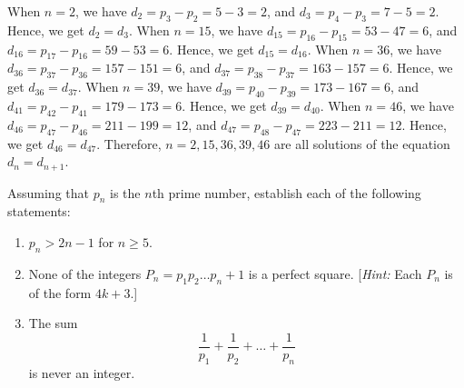 \begin{solution}
    When $n = 2$, we have $d_2 = p_3 - p_2 = 5 - 3 = 2$, and $d_3 = p_4 - p_3 = 7 - 5 = 2$. Hence, we get $d_2 = d_3$. When $n = 15$, we have $d_{15} = p_{16} - p_{15} = 53 - 47 = 6$, and $d_{16} = p_{17} - p_{16} = 59 - 53 = 6$. Hence, we get $d_{15} = d_{16}$. When $n = 36$, we have $d_{36} = p_{37} - p_{36} = 157 - 151 = 6$, and $d_{37} = p_{38} - p_{37} = 163 - 157 = 6$. Hence, we get $d_{36} = d_{37}$. When $n = 39$, we have $d_{39} = p_{40} - p_{39} = 173 - 167 = 6$, and $d_{41} = p_{42} - p_{41} = 179 - 173 = 6$. Hence, we get $d_{39} = d_{40}$. When $n = 46$, we have $d_{46} = p_{47} - p_{46} = 211 - 199 = 12$, and $d_{47} = p_{48} - p_{47} = 223 - 211 = 12$. Hence, we get $d_{46} = d_{47}$. Therefore, $n = 2, 15, 36, 39, 46$ are all solutions of the equation $d_n = d_{n+1}$. \\
\end{solution}

\begin{exercise}
    Assuming that $p_n$ is the $n$th prime number, establish each of the following statements:
    \begin{enumerate}
        \item $p_n > 2n - 1$ for $n \geq 5$.
        \item None of the integers $P_n = p_1p_2\dots p_n + 1$ is a perfect square. [\textit{Hint:} Each $P_n$ is of the form $4k+3$.]
        \item The sum
        $$\frac{1}{p_1} + \frac{1}{p_2} + \dots + \frac{1}{p_n}$$
        is never an integer.
    \end{enumerate}
\end{exercise}

